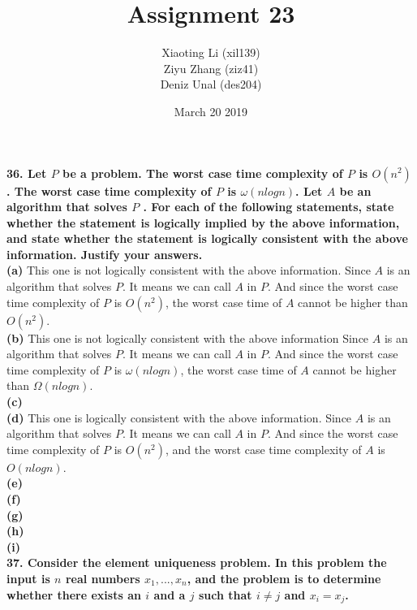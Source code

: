 \documentclass{article}
\title{Assignment 23}
\author{Xiaoting Li (xil139) \\
Ziyu Zhang (ziz41) \\
Deniz Unal (des204)}
\date{March 20 2019}
\begin{document}
\maketitle

\noindent
\textbf{36. Let $P$ be a problem. The worst case time complexity of $P$ is $O(n^2)$. The worst case time complexity of $P$ is $\omega(nlogn)$. Let $A$ be an algorithm that solves $P$ . For each of the following statements, state whether the statement is logically implied by the above information, and state whether the statement is logically consistent with the above information. Justify your answers.} \\ \newline
\textbf{(a)} This one is not logically consistent with the above information. Since $A$ is an algorithm that solves $P$. It means we can call $A$ in $P$. And since the worst case time complexity of $P$ is $O(n^2)$, the worst case time of $A$ cannot be higher than $O(n^2)$.\\ \newline
\textbf{(b)} This one is not logically consistent with the above information Since $A$ is an algorithm that solves $P$. It means we can call $A$ in $P$. And since the worst case time complexity of $P$ is $\omega(nlogn)$, the worst case time of $A$ cannot be higher than $\Omega(nlogn)$. \\ \newline
\textbf{(c)} \\ \newline
\textbf{(d)} This one is logically consistent with the above information. Since $A$ is an algorithm that solves $P$. It means we can call $A$ in $P$. And since the worst case time complexity of $P$ is $O(n^2)$, and the worst case time complexity of $A$ is $O(nlogn)$.\\ \newline
\textbf{(e)} \\ \newline
\textbf{(f)} \\ \newline
\textbf{(g)} \\ \newline
\textbf{(h)} \\ \newline
\textbf{(i)} \\ \newline
\textbf{37. Consider the element uniqueness problem. In this problem the input is $n$ real numbers $x_1,..., x_n$, and the problem is to determine whether there exists an $i$ and a $j$ such that $i\neq j$ and $x_i = x_j$.}
\end{document}
